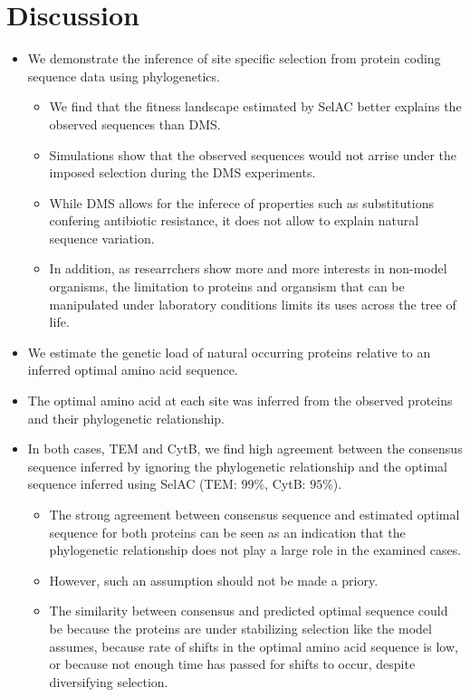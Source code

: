 \documentclass[12pt]{article}
\begin{document}
\section*{Discussion}
\begin{itemize}
	\item We demonstrate the inference of site specific selection from protein coding sequence data using phylogenetics.
	\begin{itemize}
		\item We find that the fitness landscape estimated by SelAC better explains the observed sequences than DMS.
		\item Simulations show that the observed sequences would not arrise under the imposed selection during the DMS experiments.
		\item While DMS allows for the inferece of properties such as substitutions confering antibiotic resistance, it does not allow to explain natural sequence variation.
		\item In addition, as researrchers show more and more interests in non-model organisms, the limitation to proteins and organsism that can be manipulated under laboratory conditions limits its uses across the tree of life.
	\end{itemize}
	\item We estimate the genetic load of natural occurring proteins relative to an inferred optimal amino acid sequence.
	\item The optimal amino acid at each site was inferred from the observed proteins and their phylogenetic relationship.
	\item In both cases, TEM and CytB, we find high agreement between the consensus sequence inferred by ignoring the phylogenetic relationship and the optimal sequence inferred using SelAC (TEM: $99 \%$, CytB: $95 \%$).
	\begin{itemize}
		\item The strong agreement between consensus sequence and estimated optimal sequence for both proteins can be seen as an indication that the phylogenetic relationship does not play a large role in the examined cases.
		\item However, such an assumption should not be made a priory.
		\item The similarity between consensus and predicted optimal sequence could be because the proteins are under stabilizing selection like the model assumes, because rate of shifts in the optimal amino acid sequence is low, or because not enough time has passed for shifts to occur, despite diversifying selection.

\end{itemize}
\end{itemize}
\end{document}
